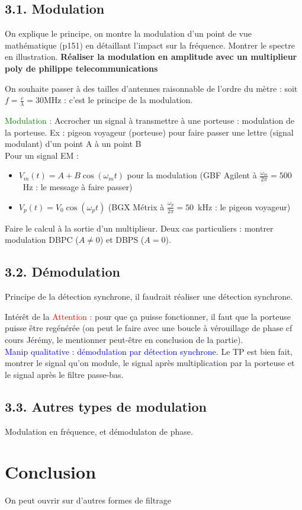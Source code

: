 \documentclass[french, a4paper, 10pt, twocolumn, landscape]{article}
\begin{document}
\subsection*{3.1. Modulation}

On explique le principe, on montre la modulation d'un point de vue mathématique (p151) en détaillant l'impact sur la fréquence. Montrer le spectre en illustration. \textbf{Réaliser la modulation en amplitude avec un multiplieur poly de philippe telecommunications } 


On souhaite passer à des tailles d'antennes raisonnable de l'ordre du mètre : soit $f=\frac{c}{\lambda}=30$MHz : c'est le principe de la modulation.

\textcolor{green}{Modulation :} Accrocher un signal à transmettre à une porteuse : modulation de la porteuse. Ex : pigeon voyageur (porteuse) pour faire passer une lettre (signal modulant) d'un point A à un point B\\

Pour un signal EM : 
\begin{itemize}
    \item $V_m(t)=A+B\cos(\omega_mt)$ pour la modulation (GBF Agilent à $\frac{\omega_m}{2\pi}=500$~Hz : le message à faire passer)
    \item $V_p(t) = V_0\cos(\omega_pt)$ (BGX Métrix à $\frac{\omega_p}{2\pi}=50$~kHz : le pigeon voyageur)
\end{itemize}

Faire le calcul à la sortie d'un multiplieur. Deux cas particuliers : montrer modulation DBPC ($A\neq0$) et DBPS ($A=0$).

\subsection*{3.2. Démodulation}

Principe de la détection synchrone, il faudrait réaliser une détection synchrone.

Intérêt de la 
\textcolor{red}{Attention :} pour que ça puisse fonctionner, il faut que la porteuse puisse être regénérée (on peut le faire avec une boucle à vérouillage de phase cf cours Jérémy, le mentionner peut-être en conclusion de la partie).\\

\textcolor{blue}{Manip qualitative : démodulation par détection synchrone}. Le TP est bien fait, montrer le signal qu'on module, le signal après multiplication par la porteuse et le signal après le filtre passe-bas.

\subsection*{3.3. Autres types de modulation}

Modulation en fréquence, et démodulaton de phase. 

\section*{Conclusion}

On peut ouvrir sur d'autres formes de filtrage
\end{document}
